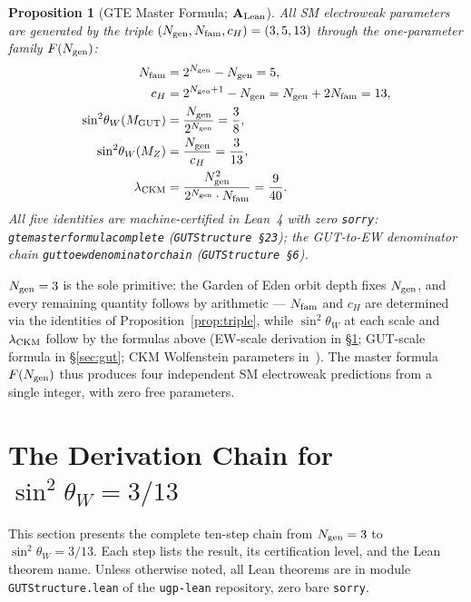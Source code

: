 \documentclass[11pt]{article}
\newtheorem{proposition}[theorem]{Proposition}
\theoremstyle{remark}
\newcommand{\Ngen}{N_{\rm gen}}
\newcommand{\Nfam}{N_{\rm fam}}
\newcommand{\cH}{c_H}
\newcommand{\lean}[1]{%
  \penalty-100
  \begingroup\def\_{\textunderscore\allowbreak}\texttt{#1}\endgroup}
\newcommand{\sinwsq}{\sin^2\!\theta_W}
\newcommand{\CatAL}{\ensuremath{\textbf{A}_{\rm Lean}}}
\begin{document}
\begin{proposition}[GTE Master Formula; $\CatAL$]
\label{prop:master_formula}
All SM electroweak parameters are generated by the triple
$(\Ngen, \Nfam, \cH) = (3, 5, 13)$ through the one-parameter family $F(\Ngen)$:
\begin{align}
  \Nfam &= 2^{\Ngen} - \Ngen = 5,
    \label{eq:master_nfam}\\
  \cH   &= 2^{\Ngen+1} - \Ngen = \Ngen + 2\Nfam = 13,
    \label{eq:master_ch}\\
  \sinwsq(M_{\rm GUT}) &= \frac{\Ngen}{2^{\Ngen}} = \frac{3}{8},
    \label{eq:master_gut}\\
  \sinwsq(M_Z) &= \frac{\Ngen}{\cH} = \frac{3}{13},
    \label{eq:master_ew}\\
  \lambda_{\rm CKM} &= \frac{\Ngen^2}{2^{\Ngen}\cdot\Nfam} = \frac{9}{40}.
    \label{eq:master_ckm}
\end{align}
All five identities are machine-certified in Lean~4 with zero \texttt{sorry}:
\lean{gte\_master\_formula\_complete} (\texttt{GUTStructure~\S23});
the GUT-to-EW denominator chain \lean{gut\_to\_ew\_denominator\_chain}
(\texttt{GUTStructure~\S6}).
\end{proposition}

\noindent
$\Ngen = 3$ is the sole primitive: the Garden of Eden orbit depth fixes $\Ngen$, and every
remaining quantity follows by arithmetic — $\Nfam$ and $\cH$ are determined
via the identities of Proposition~\ref{prop:triple}, while $\sinwsq$ at each scale and
$\lambda_{\rm CKM}$ follow by the formulas above
(EW-scale derivation in \S\ref{sec:derivation}; GUT-scale formula in \S\ref{sec:gut};
CKM Wolfenstein parameters in~\cite{SpivackCKM}).
The master formula $F(\Ngen)$ thus produces four independent SM electroweak predictions
from a single integer, with zero free parameters.

\section{The Derivation Chain for \texorpdfstring{$\sin^2\theta_W = 3/13$}{sin2tW = 3/13}}
\label{sec:derivation}

This section presents the complete ten-step chain from $\Ngen = 3$ to $\sinwsq = 3/13$.
Each step lists the result, its certification level, and the Lean theorem name.
Unless otherwise noted, all Lean theorems are in module \texttt{GUTStructure.lean}
of the \texttt{ugp-lean} repository, zero bare \texttt{sorry}.
\end{document}
